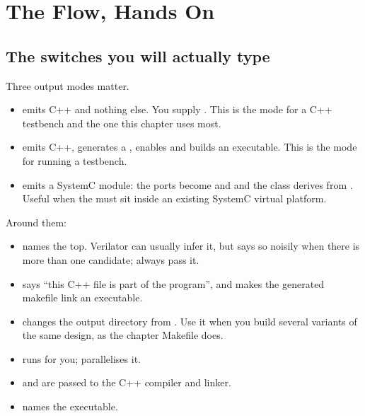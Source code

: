 \section{The Flow, Hands On}
\label{sec:verilator:flow}

\subsection{The switches you will actually type}

Three output modes matter.

\begin{itemize}
  \item {} emits C++ and nothing else. You supply .
        This is the mode for a C++ testbench and the one this chapter uses
        most.
  \item {} emits C++, generates a , enables
         and builds an executable. This is the mode for
        running a \SV{} testbench.
  \item {} emits a SystemC module: the ports become
         and  and the class derives from
        . Useful when the \DUT{} must sit inside an existing
        SystemC virtual platform.
\end{itemize}

Around them:

\begin{itemize}
  \item {} names the top. Verilator can usually
        infer it, but says so noisily when there is more than one candidate;
        always pass it.
  \item {} says ``this C++ file is part of the program'',
        and makes the generated makefile link an executable.
  \item {} changes the output directory from .
        Use it when you build several variants of the same design, as the
        chapter Makefile does.
  \item {} runs  for you;  parallelises it.
  \item {} and  are passed to the
        C++ compiler and linker.
  \item {} names the executable.
\end{itemize}


